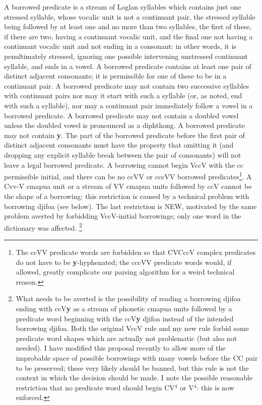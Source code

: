 \documentclass[12pt]{book}
\begin{document}
A borrowed predicate is a stream of Loglan syllables which contains just one stressed syllable, whose vocalic unit is not a continuant pair,
the stressed syllable being followed by at least one and no more than two syllables, the first of these, if there are two, having a continuant vocalic unit, and the final one not having a continuant vocalic unit and not ending in a consonant:  in other words, it is penultimately stressed, ignoring one possible intervening unstressed continuant syllable, and ends in a vowel.  A borrowed predicate contains at least one pair of distinct adjacent consonants;  it is permissible for one of these to be in a continuant pair.  A borrowed predicate may not contain two successive syllables with continuant pairs nor may it start with such a syllable (or, as noted, end with such a syllable), nor may a continuant pair immediately follow a vowel in a borrowed predicate.  A borrowed predicate may not contain a doubled vowel unless the doubled vowel is pronounced as a diphthong.   A borrowed predicate may not contain {\bf y}.  The part of the borrowed predicate
before the first pair of distinct adjacent consonants must have the property that omitting it (and dropping any explicit syllable break between the pair of consonants) will not leave a legal borrowed predicate.  A borrowing cannot begin VccV with the cc permissible initial, and there can be no ccVV
or cccVV borrowed predicates\footnote{The ccVV predicate words are forbidden so that CVCccV complex predicates do not have to be {\bf y}-hyphenated; the cccVV predicate words would, if allowed, greatly complicate our parsing algorithm for a weird technical reason.}.  A Cvv-V cmapua unit or a stream of VV cmapua units followed by ccV  cannot be the shape of a borrowing:  this restriction is caused by a technical problem with borrowing djifoa (see below).  The last restriction is NEW, motivated by the same problem averted by forbidding VccV-initial borrowings;  only one word in the dictionary was affected.  \footnote{What needs to be averted is the possibility of reading a borrowing djifoa ending with ccV{\bf y} as
a stream of phonetic cmapua units followed by a predicate word beginning with the ccV{\bf y} djifoa instead of the intended borrowing djifoa.  Both the original VccV rule and my new rule forbid some predicate word shapes which are actually not problematic (but also not needed).  I have modified this proposal recently to allow more of the improbable space of possible borrowings with many vowels before the CC pair to be preserved;  these very likely should be banned, but this rule is not the context in which the decision should be made.  I note the possible reasonable restriction that no predicate word should begin
CV$^{4}$ or V$^4$:  this is now enforced.}
\end{document}
